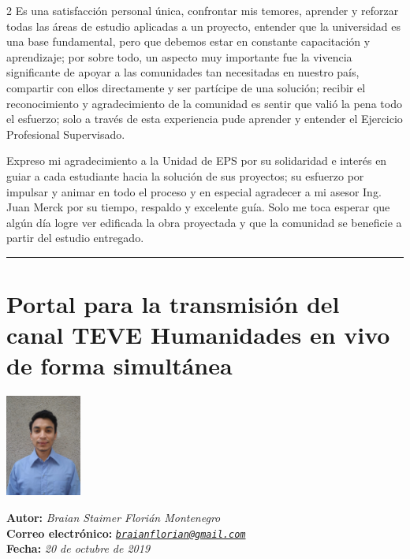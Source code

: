 \documentclass[12pt,spanish,Letterpaper,openany]{book}
\newcommand{\tcolorboxcommand}{\begin{tcolorbox}[sharp corners=uphill, colback=newfondo, colframe=newfondo, arc=6mm, boxrule=0mm, boxsep=0mm]}
\newcommand{\HRule}{\begin{center}\rule{0.5\linewidth}{0.2mm}\end{center}}
\begin{document}
\begin {multicols}{2}
Es una satisfacción personal única, confrontar mis temores, aprender y reforzar todas las áreas de estudio aplicadas a un proyecto, entender que la universidad es una base fundamental, pero que debemos estar en constante capacitación y aprendizaje; por sobre todo, un aspecto muy importante fue la vivencia significante de apoyar a las comunidades tan necesitadas en nuestro país, compartir con ellos directamente y ser partícipe de una solución; recibir el reconocimiento y agradecimiento de la comunidad es sentir que valió la pena todo el esfuerzo; solo a través de esta experiencia pude aprender y entender el Ejercicio Profesional Supervisado.

Expreso mi agradecimiento a la Unidad de EPS por su solidaridad e interés en guiar a cada estudiante hacia la solución de sus proyectos; su esfuerzo por impulsar y animar en todo el proceso y en especial agradecer a mi asesor Ing. Juan Merck por su tiempo, respaldo y excelente guía. Solo me toca esperar que algún día logre ver edificada la obra proyectada y que la comunidad se beneficie a partir del estudio entregado.

\end {multicols}

\medskip

\HRule

\medskip

\hypertarget{bflorian1}{%
\chapter{Portal para la transmisión del canal TEVE Humanidades en vivo de forma simultánea}\label{bflorian1}}

\begin {flushleft}

\tcolorboxcommand

\begin{minipage}[c]{3cm}

\includegraphics[width=2.5cm,height=\textheight]{images/image01_bflorian1.jpg}

\end{minipage}\begin{minipage}[c]{12cm}

\textbf{Autor:} \emph{Braian Staimer Florián Montenegro}\\
\textbf{Correo electrónico:} \emph{\href{mailto:braianflorian@gmail.com}{\nolinkurl{braianflorian@gmail.com}}}\\
\textbf{Fecha:} \emph{20 de octubre de 2019}

\end{minipage}

\end {tcolorbox}

\end {flushleft}
\end{document}

